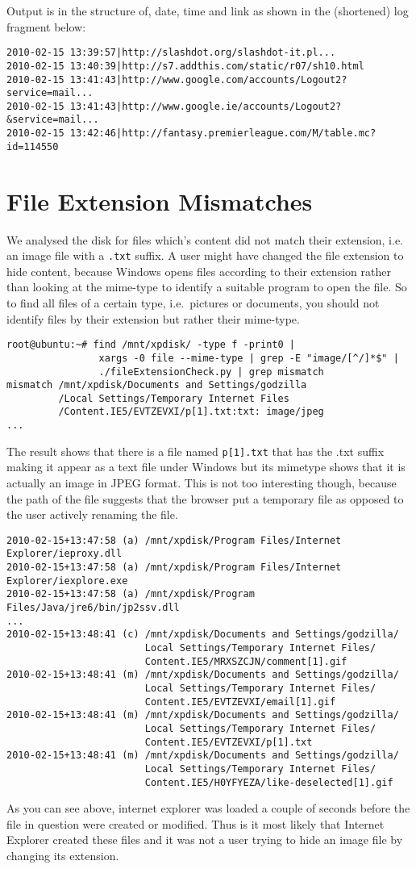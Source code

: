 \documentclass[a4paper,
    11pt,
    normalheadings,
    parindent,
    UKenglish,
    abstracton,
    ]{scrartcl}
\begin{document}
Output is in the structure of, date, time and link as shown in the (shortened) log fragment below:
\begin{verbatim}
2010-02-15 13:39:57|http://slashdot.org/slashdot-it.pl...
2010-02-15 13:40:39|http://s7.addthis.com/static/r07/sh10.html
2010-02-15 13:41:43|http://www.google.com/accounts/Logout2?service=mail...
2010-02-15 13:41:43|http://www.google.ie/accounts/Logout2?&service=mail...
2010-02-15 13:42:46|http://fantasy.premierleague.com/M/table.mc?id=114550
\end{verbatim}


\section{File Extension Mismatches}

We analysed the disk for files which's content did not match their extension, i.e.\, an image file with a \texttt{.txt} suffix.
A user might have changed the file extension to hide content, because Windows opens files according to their extension rather than looking at the mime-type to identify a suitable program to open the file.
So to find all files of a certain type, i.e.\, pictures or documents, you should not identify files by their extension but rather their mime-type.
\begin{verbatim}
root@ubuntu:~# find /mnt/xpdisk/ -type f -print0 |
                xargs -0 file --mime-type | grep -E "image/[^/]*$" |
                ./fileExtensionCheck.py | grep mismatch
mismatch /mnt/xpdisk/Documents and Settings/godzilla
         /Local Settings/Temporary Internet Files
         /Content.IE5/EVTZEVXI/p[1].txt:txt: image/jpeg
...
\end{verbatim}
The result shows that there is a file named \verb|p[1].txt| that has the .txt suffix making it appear as a text file under Windows but its mimetype shows that it is actually an image in JPEG format.
This is not too interesting though, because the path of the file suggests that the browser put a temporary file as opposed to the user actively renaming the file.

\begin{verbatim}
2010-02-15+13:47:58 (a) /mnt/xpdisk/Program Files/Internet Explorer/ieproxy.dll
2010-02-15+13:47:58 (a) /mnt/xpdisk/Program Files/Internet Explorer/iexplore.exe
2010-02-15+13:47:58 (a) /mnt/xpdisk/Program Files/Java/jre6/bin/jp2ssv.dll
...
2010-02-15+13:48:41 (c) /mnt/xpdisk/Documents and Settings/godzilla/
                        Local Settings/Temporary Internet Files/
                        Content.IE5/MRXSZCJN/comment[1].gif
2010-02-15+13:48:41 (m) /mnt/xpdisk/Documents and Settings/godzilla/
                        Local Settings/Temporary Internet Files/
                        Content.IE5/EVTZEVXI/email[1].gif
2010-02-15+13:48:41 (m) /mnt/xpdisk/Documents and Settings/godzilla/
                        Local Settings/Temporary Internet Files/
                        Content.IE5/EVTZEVXI/p[1].txt
2010-02-15+13:48:41 (m) /mnt/xpdisk/Documents and Settings/godzilla/
                        Local Settings/Temporary Internet Files/
                        Content.IE5/H0YFYEZA/like-deselected[1].gif
\end{verbatim}

As you can see above, internet explorer was loaded a couple of seconds before the file in question were created or modified.
Thus is it most likely that Internet Explorer created these files and it was not a user trying to hide an image file by changing its extension.
\end{document}
